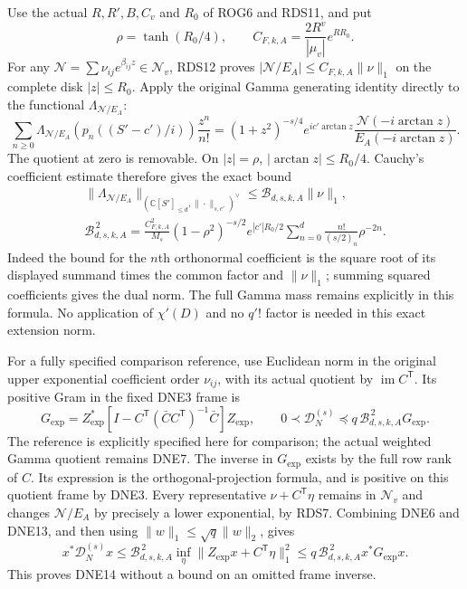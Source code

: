 \documentclass[11pt,a4paper]{article}
\begin{document}
Use the actual $R,R',B,C_v$ and $R_0$ of ROG6 and RDS11,
and put
\[
 \rho=\tanh(R_0/4),\qquad
 C_{F,k,A}=\frac{2R^v}{|\mu_v|}e^{RR_0}.
 \tag{DNE11}
\]
For any $\mathcal N=\sum\nu_{ij}e^{\beta_{ij}z}
\in\mathscr N_v$, RDS12 proves
$|\mathcal N/E_A|\le C_{F,k,A}\|\nu\|_1$
on the complete disk $|z|\le R_0$.
Apply the original Gamma generating identity directly to
the functional $\Lambda_{\mathcal N/E_A}$:
\[
 \sum_{n\ge0}\Lambda_{\mathcal N/E_A}
          \left(p_n((S'-c')/i)\right)\frac{z^n}{n!}
 =(1+z^2)^{-s/4}e^{ic'\arctan z}
                       \frac{\mathcal N(-i\arctan z)}
                            {E_A(-i\arctan z)}.
 \tag{DNE12}
\]
The quotient at zero is removable. On $|z|=\rho$,
$|\arctan z|\le R_0/4$.
Cauchy's coefficient estimate therefore gives the exact bound
\[
 \begin{gathered}
 \|\Lambda_{\mathcal N/E_A}\|_
             {(\mathbb C[S']_{\le d},\|\cdot\|_{s,c'})^\vee}
       \le \mathcal B_{d,s,k,A}\|\nu\|_1,\\
 \mathcal B_{d,s,k,A}^{\,2}
 =\frac{C_{F,k,A}^2}{M_s}
    (1-\rho^2)^{-s/2}e^{|c'|R_0/2}
       \sum_{n=0}^d\frac{n!}{(s/2)_n}\rho^{-2n}.
 \end{gathered}\tag{DNE13}
\]
Indeed the bound for the $n$th orthonormal coefficient is
the square root of its displayed summand times the common
factor and $\|\nu\|_1$; summing squared coefficients gives
the dual norm. The full Gamma mass remains explicitly in
this formula. No application of $\chi'(D)$ and no
$q'!$ factor is needed in this exact extension norm.

For a fully specified comparison reference, use Euclidean
norm in the original upper exponential coefficient order
$\nu_{ij}$, with its actual quotient by
$\operatorname{im}C^{\mathsf T}$. Its positive Gram in the
fixed DNE3 frame is
\[
 G_{\exp}
 =Z_{\exp}^*
  \left[I-C^{\mathsf T}
     (\bar C C^{\mathsf T})^{-1}\bar C\right]Z_{\exp},
 \qquad
 0\prec\mathcal D_N^{(s)}
       \preceq q\,\mathcal B_{d,s,k,A}^{\,2}G_{\exp}.
 \tag{DNE14}
\]
The reference is explicitly specified here for comparison;
the actual weighted Gamma quotient remains DNE7.
The inverse in $G_{\exp}$ exists by the full row rank of
$C$. Its expression is the orthogonal-projection formula,
and is positive on this quotient frame by DNE3.
Every representative $\nu+C^{\mathsf T}\eta$ remains in
$\mathscr N_v$ and changes $\mathcal N/E_A$ by precisely a
lower exponential, by RDS7. Combining DNE6 and DNE13,
and then using $\|w\|_1\le\sqrt q\|w\|_2$, gives
\[
 x^*\mathcal D_N^{(s)}x
 \le\mathcal B_{d,s,k,A}^{\,2}
      \inf_\eta\|Z_{\exp}x+C^{\mathsf T}\eta\|_1^2
 \le q\,\mathcal B_{d,s,k,A}^{\,2}x^*G_{\exp}x.
\]
This proves DNE14 without a bound on an omitted frame inverse.
\end{document}
